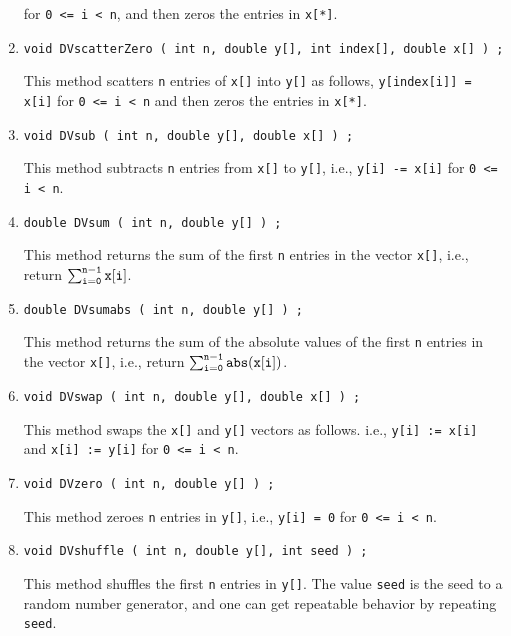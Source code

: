 \begin{enumerate}
for {\tt 0 <= i < n},
and then zeros the entries in {\tt x[*]}.
\item
\begin{verbatim}
void DVscatterZero ( int n, double y[], int index[], double x[] ) ;
\end{verbatim}
This method scatters {\tt n} entries of {\tt x[]} into {\tt y[]} 
as follows,
{\tt y[index[i]] = x[i]} 
for {\tt 0 <= i < n}
and then zeros the entries in {\tt x[*]}.
\item
\begin{verbatim}
void DVsub ( int n, double y[], double x[] ) ;
\end{verbatim}
This method subtracts {\tt n} entries from {\tt x[]} to {\tt y[]},
i.e.,
{\tt y[i] -= x[i]}
for {\tt 0 <= i < n}.
\item
\begin{verbatim}
double DVsum ( int n, double y[] ) ;
\end{verbatim}
This method returns the sum of the first {\tt n} entries 
in the vector {\tt x[]},
i.e., return
$\sum_{\tt i = 0}^{\tt n-1} {\tt x[i]}$.
\item
\begin{verbatim}
double DVsumabs ( int n, double y[] ) ;
\end{verbatim}
This method returns the sum of the absolute values of the 
first {\tt n} entries in the vector {\tt x[]},
i.e., return
$\sum_{\tt i = 0}^{\tt n-1} {\tt abs(x[i])}$.
\item
\begin{verbatim}
void DVswap ( int n, double y[], double x[] ) ;
\end{verbatim}
This method swaps the {\tt x[]} and {\tt y[]} vectors as follows.
i.e.,
{\tt y[i] := x[i]} and
{\tt x[i] := y[i]} 
for {\tt 0 <= i < n}.
\item
\begin{verbatim}
void DVzero ( int n, double y[] ) ;
\end{verbatim}
This method zeroes {\tt n} entries in {\tt y[]},
i.e.,
{\tt y[i] = 0} 
for {\tt 0 <= i < n}.
\item
\begin{verbatim}
void DVshuffle ( int n, double y[], int seed ) ;
\end{verbatim}
This method shuffles the first {\tt n} entries in {\tt y[]}.
The value {\tt seed} is the seed to a random number generator,
and one can get repeatable behavior by repeating {\tt seed}.
\end{enumerate}
